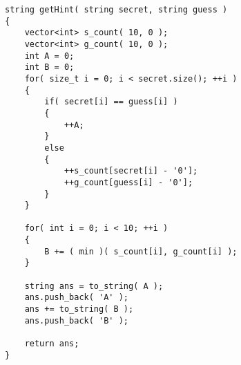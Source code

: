 \begin{lstlisting}[style=customc, caption={Two Pass}]
string getHint( string secret, string guess )
{
    vector<int> s_count( 10, 0 );
    vector<int> g_count( 10, 0 );
    int A = 0;
    int B = 0;
    for( size_t i = 0; i < secret.size(); ++i )
    {
        if( secret[i] == guess[i] )
        {
            ++A;
        }
        else
        {
            ++s_count[secret[i] - '0'];
            ++g_count[guess[i] - '0'];
        }
    }

    for( int i = 0; i < 10; ++i )
    {
        B += ( min )( s_count[i], g_count[i] );
    }

    string ans = to_string( A );
    ans.push_back( 'A' );
    ans += to_string( B );
    ans.push_back( 'B' );

    return ans;
}
\end{lstlisting}